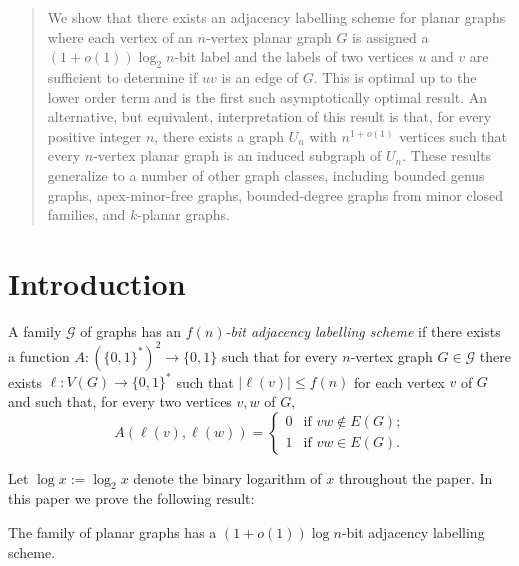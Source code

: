 \documentclass[10pt, conference, compsocconf]{IEEEtran}
\let\le\leqslant
\begin{document}
\maketitle

\begin{abstract}
  We show that there exists an adjacency labelling scheme for planar graphs where each vertex of an $n$-vertex planar graph $G$ is assigned a $(1+o(1))\log_2 n$-bit label and the labels of two vertices $u$ and $v$ are sufficient to determine if $uv$ is an edge of $G$.  This is optimal up to the lower order term and is the first such asymptotically optimal result.  An alternative, but equivalent, interpretation of this result is that, for every positive integer $n$, there exists a graph $U_n$ with $n^{1+o(1)}$ vertices such that every $n$-vertex planar graph is an induced subgraph of $U_n$.  These results generalize to a number of other graph classes, including bounded genus graphs, apex-minor-free graphs,  bounded-degree graphs from minor closed families, and $k$-planar graphs.
\end{abstract}

\section{Introduction}


A family $\mathcal{G}$ of graphs has an \emph{$f(n)$-bit adjacency labelling scheme} if there exists a function $A:(\{0,1\}^*)^2\to \{0,1\}$ such that for every $n$-vertex graph $G\in \mathcal{G}$ there exists $\ell:V(G)\to\{0,1\}^*$ such that $|\ell(v)|\le f(n)$ for each vertex $v$ of $G$ and such that, for every two vertices $v,w$ of $G$,
\[  A(\ell(v),\ell(w)) =
      \begin{cases}
        0 & \text{if $vw\not\in E(G)$;} \\
        1 & \text{if $vw\in E(G)$.}
      \end{cases}
\]

Let $\log x:=\log_2 x$ denote the binary logarithm of $x$ throughout the paper.
In this paper we prove the following result:
\begin{thm}
  The family of planar graphs has a $(1+o(1))\log n$-bit adjacency labelling scheme.
\end{thm}
\end{document}
